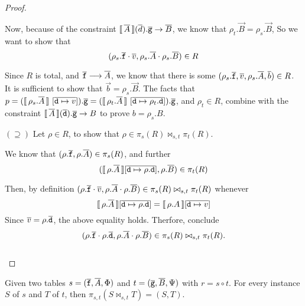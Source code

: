 \begin{proof}
\begin{enumerate}[align=left]
  \end{enumerate}

  Now, because of the constraint
  $\llbracket\,\overline{A}\,\rrbracket(\overline{d}).\overline{\texttt{g}} \to \overline{B}$, we know that
  $\rho_t.\vec B = \rho_s.\vec B$, So we want to show
  that
  \[(\rho_s.\overline{\texttt{f}}\cdot \overline{v}, \rho_s.\overline{A} \cdot \rho_s.\overline{B}) \in
    R\]

  Since $R$ is total, and $\overline{\texttt{f}} \longrightarrow \overline{A}$, we
  know that there is some
  $(\rho_s.\overline{\texttt{f}}, \overline{v}, \rho_s.\overline{A}, \overline{b}) \in R$. It is
  sufficient to show that $\vec b = \rho_s.\vec B$.  The facts that
  $p = (\llbracket\,\rho_s.\overline{A}\,\rrbracket~[\overline{\texttt{d} \mapsto
    v}]).\overline{\texttt{g}} = (\llbracket\,\rho_t.\overline{A}\,\rrbracket~[\overline{\texttt{d}
    \mapsto \rho_t.\texttt{d}}]).\overline{\texttt{g}}$, and $\rho_t \in R$,
  combine with the constraint
  $\llbracket\,\overline{A}\,\rrbracket(\overline{\texttt{d}}).\overline{\texttt{g}} \to B$ to
  prove $b = \rho_s.B$. \hfill \checkmark

\item[$(\supseteq)$] Let $\rho \in R$, to show
  that $\rho \in \pi_s(R) \bowtie_{s,t} \pi_t(R)$.

  We know that $(\rho.\overline{\texttt{f}}, \rho.\overline{A}) \in \pi_s(R)$, and further
  \[(\llbracket\,\rho.\overline{A}\,\rrbracket[\overline{\texttt{d} \mapsto \rho.\texttt{d}}],\rho.\overline{B}) \in
    \pi_t(R)\]

  Then, by definition
  $(\rho.\overline{\texttt{f}}\cdot \overline{v}, \rho.\overline{A}\cdot \rho.\overline{B}) \in \pi_s(R)
  \bowtie_{s,t} \pi_t(R)$ whenever
  \[\llbracket\,\rho.\overline{A}\,\rrbracket[\overline{\texttt{d} \mapsto \rho.\texttt{d}}]
    = \llbracket\,\rho.A\,\rrbracket[\overline{\texttt{d} \mapsto v}]\] Since
  $\overline{v} = \rho.\overline{\texttt{d}}$, the above equality holds. Therfore,
  conclude
  \[(\rho.\overline{\texttt{f}}\cdot \rho.\overline{\texttt{d}}, \rho.\overline{A} \cdot \rho.\overline{B}) \in \pi_s(R)
    \bowtie_{s,t} \pi_t(R).\]
  \mbox{} \hfill \checkmark\\\mbox{}
\end{proof}

\begin{proposition}
  \label{prop:proj-join}
  Given two tables $s = (\overline{\texttt{f}},\overline{A}, \Phi)$ and
  $t = (\overline{\texttt{g}},\overline{B}, \Psi)$ with $r = s \circ t$. For every
  instance $S$ of $s$ and $T$ of $t$, then
  $\pi_{s,t}(S \bowtie_{s,t} T) = (S,T)$.
\end{proposition}


